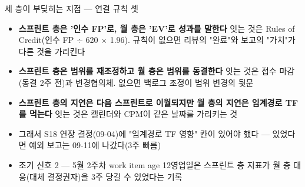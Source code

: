 \begin{frame}{세 층이 부딪히는 지점 — 연결 규칙 셋}
\begin{itemize}
\item \textbf{스프린트 층은 '인수 FP'로, 월 층은 'EV'로 성과를 말한다} \ra{} 잇는 것은 Rules of Credit(인수 FP ÷ 620 × 1.96). 규칙이 없으면 리뷰의 "완료"와 보고의 "가치"가 다른 것을 가리킨다
\item \textbf{스프린트 층은 범위를 재조정하고 월 층은 범위를 동결한다} \ra{} 잇는 것은 접수 마감(동결 2주 전)과 변경협의체. 없으면 백로그 조정이 범위 변경의 뒷문
\item \textbf{스프린트 층의 지연은 다음 스프린트로 이월되지만 월 층의 지연은 임계경로 TF를 먹는다} \ra{} 잇는 것은 캘린더와 CPM이 같은 날짜를 가리키는 것
\item 그래서 S18 연장 결정(09-04)에 "임계경로 TF 영향" 칸이 있어야 했다 — 있었다면 예외 보고는 09-11에 나갔다(3주 빠름)
\item 조기 신호 2 — 5월 2주차 work item age 12영업일은 스프린트 층 지표가 월 층 대응(대체 결정권자)을 3주 당길 수 있었다는 기록
\end{itemize}
\end{frame}

